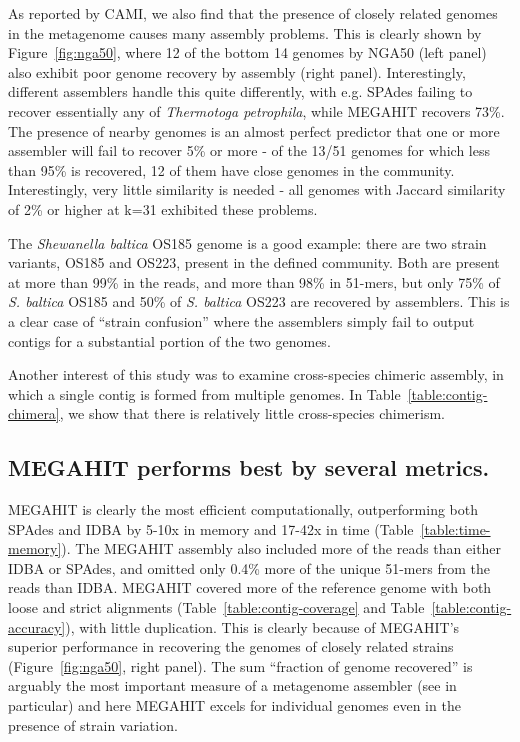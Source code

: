 \documentclass[11pt]{article}
\begin{document}
As reported by CAMI, we also find that the presence of closely related
genomes in the metagenome causes many assembly problems.  This is
clearly shown by Figure~\ref{fig:nga50}, where 12 of the bottom 14
genomes by NGA50 (left panel) also exhibit poor genome recovery by
assembly (right panel).  Interestingly, different assemblers handle
this quite differently, with e.g. SPAdes failing to recover
essentially any of {\em Thermotoga petrophila}, while MEGAHIT recovers
73\%.  The presence of nearby genomes is an almost perfect predictor
that one or more assembler will fail to recover 5\% or more - of the
13/51 genomes for which less than 95\% is recovered, 12 of them have
close genomes in the community.  Interestingly, very little similarity
is needed - all genomes with Jaccard similarity of 2\% or higher at k=31
exhibited these problems.

The {\em Shewanella baltica} OS185 genome is a good example: there
are two strain variants, OS185 and OS223, present in the defined
community.  Both are present at more than 99\% in the reads, and more
than 98\% in 51-mers, but only 75\% of {\em S. baltica} OS185 and 50\%
of {\em S. baltica} OS223 are recovered by assemblers.  This is a
clear case of ``strain confusion'' where the assemblers simply fail to
output contigs for a substantial portion of the two genomes.

Another interest of this study was to examine cross-species chimeric
assembly, in which a single contig is formed from multiple genomes.
In Table~\ref{table:contig-chimera}, we show that there is relatively
little cross-species chimerism.

\subsection*{MEGAHIT performs best by several metrics.}

MEGAHIT is clearly the most efficient computationally, outperforming
both SPAdes and IDBA by 5-10x in memory and 17-42x in time
(Table~\ref{table:time-memory}).  The MEGAHIT assembly also included
more of the reads than either IDBA or SPAdes, and omitted only 0.4\%
more of the unique 51-mers from the reads than IDBA.  MEGAHIT covered
more of the reference genome with both loose and strict alignments
(Table~\ref{table:contig-coverage} and
Table~\ref{table:contig-accuracy}), with little duplication.  This is
clearly because of MEGAHIT's superior performance in recovering the
genomes of closely related strains (Figure~\ref{fig:nga50}, right
panel).  The sum ``fraction of genome recovered'' is arguably the most
important measure of a metagenome assembler (see \cite{Vollmers2017}
in particular) and here MEGAHIT excels for individual genomes even in
the presence of strain variation.
\end{document}
